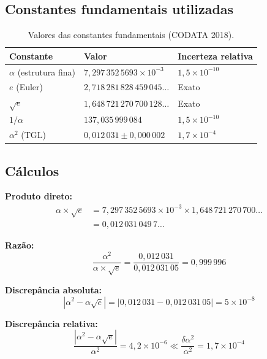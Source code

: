 \documentclass[12pt,a4paper,twoside]{article}
\newcommand{\alphaii}{\alpha^{2}}
\begin{document}
\subsection{Constantes fundamentais utilizadas}

\begin{table}[H]
\centering
\caption{Valores das constantes fundamentais (CODATA 2018).}
\label{tab:constantes}
\begin{tabular}{lll}
\toprule
\textbf{Constante} & \textbf{Valor} & \textbf{Incerteza relativa} \\
\midrule
$\alpha$ (estrutura fina) & $7{,}297\,352\,5693 \times 10^{-3}$ & $1{,}5 \times 10^{-10}$ \\
$e$ (Euler) & $2{,}718\,281\,828\,459\,045\ldots$ & Exato \\
$\sqrt{e}$ & $1{,}648\,721\,270\,700\,128\ldots$ & Exato \\
$1/\alpha$ & $137{,}035\,999\,084$ & $1{,}5 \times 10^{-10}$ \\
$\alphaii$ (TGL) & $0{,}012\,031 \pm 0{,}000\,002$ & $1{,}7 \times 10^{-4}$ \\
\bottomrule
\end{tabular}
\end{table}

\subsection{Cálculos}

\textbf{Produto direto:}
\begin{align}
\alpha \times \sqrt{e} &= 7{,}297\,352\,5693 \times 10^{-3} \times 1{,}648\,721\,270\,700\ldots \nonumber \\
&= 0{,}012\,031\,049\,7\ldots
\end{align}

\textbf{Razão:}
\begin{equation}
\frac{\alphaii}{\alpha \times \sqrt{e}} = \frac{0{,}012\,031}{0{,}012\,031\,05} = 0{,}999\,996
\end{equation}

\textbf{Discrepância absoluta:}
\begin{equation}
|\alphaii - \alpha\sqrt{e}| = |0{,}012\,031 - 0{,}012\,031\,05| = 5 \times 10^{-8}
\end{equation}

\textbf{Discrepância relativa:}
\begin{equation}
\frac{|\alphaii - \alpha\sqrt{e}|}{\alphaii} = 4{,}2 \times 10^{-6} \ll \frac{\delta\alphaii}{\alphaii} = 1{,}7 \times 10^{-4}
\end{equation}
\end{document}
